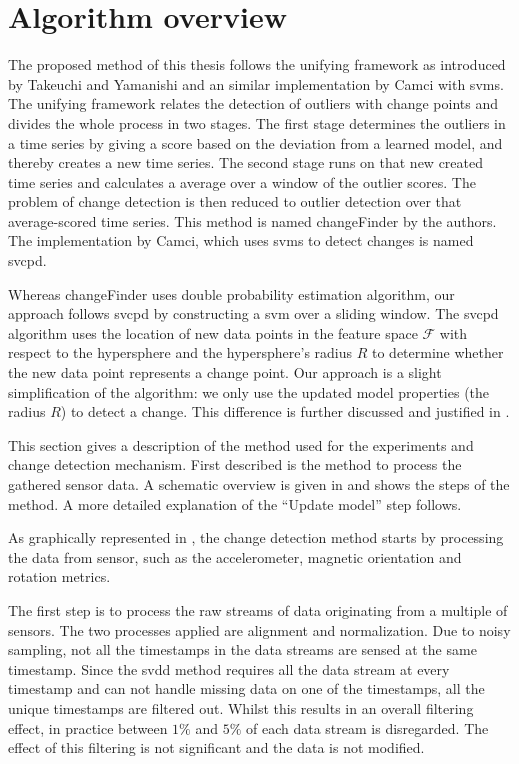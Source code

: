 \section{Algorithm overview}\label{sec:method_overview}
The proposed method of this thesis follows the unifying framework as introduced by Takeuchi and Yamanishi \cite{takeuchi2006unifying} and an similar implementation by Camci \cite{camci2010change} with \glspl{svm}.
The unifying framework relates the detection of outliers with change points and divides the whole process in two stages.
The first stage determines the outliers in a time series by giving a score based on the deviation from a learned model, and thereby creates a new time series.
The second stage runs on that new created time series and calculates a average over a window of the outlier scores.
The problem of change detection is then reduced to outlier detection over that average-scored time series.
This method is named \gls{changeFinder} by the authors.
The implementation by Camci, which uses \glspl{svm} to detect changes is named \acrlong{svcpd}.

Whereas \gls{changeFinder} uses double probability estimation algorithm, our approach follows \gls{svcpd} by constructing a \gls{svm} over a sliding window.
The \gls{svcpd} algorithm uses the location of new data points in the feature space $\mathcal{F}$ with respect to the hypersphere and the hypersphere's radius $R$ to determine whether the new data point represents a change point.
Our approach is a slight simplification of the algorithm: we only use the updated model properties (\ie the radius $R$) to detect a change.
This difference is further discussed and justified in .

This section gives a description of the method used for the experiments and change detection mechanism.
First described is the method to process the gathered sensor data.
A schematic overview is given in  and shows the steps of the method.
A more detailed explanation of the ``Update model'' step follows.

As graphically represented in , the change detection method starts by processing the data from sensor, such as the accelerometer, magnetic orientation and rotation metrics.

The first step is to process the raw streams of data originating from a multiple of sensors.
The two processes applied are alignment and normalization.
Due to noisy sampling, not all the timestamps in the data streams are sensed at the same timestamp.
Since the \gls{svdd} method requires all the data stream at every timestamp and can not handle missing data on one of the timestamps, all the unique timestamps are filtered out.
Whilst this results in an overall filtering effect, in practice between $1\%$ and $5\%$ of each data stream is disregarded.
The effect of this filtering is not significant and the data is not modified.

